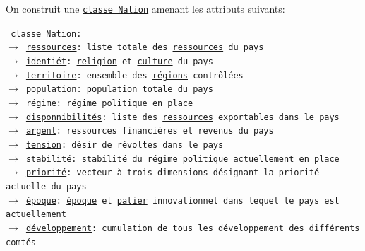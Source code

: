 \documentclass{article}
\newcommand{\ulcolor}[2][class]{\setulcolor{#1}\ul{#2}}
\newcommand{\ulcolor}[2][var]{\setulcolor{#1}\ul{#2}}
\newcommand{\ulcolor}[2][func]{\setulcolor{#1}\ul{#2}}
\newcommand*{\mybox}[2]{\colorbox{#1!30}{\parbox{.98\linewidth}{#2}}}
\newcommand\tab[1][0.5cm]{\hspace*{#1}}
\newcommand{\genbox}[1]{\mybox{verylightgray}{#1}}
\newcommand{\classbox}[1]{\mybox{palegreen}{\texttt{\textcolor{codeColour}{#1}}}}
\newcommand{\class}[1]{\texttt{\textcolor{codeColour}{\ulcolor[class]{#1}}}}
\newcommand{\var}[1]{\texttt{\textcolor{codeColour}{\ulcolor[var]{#1}}}}
\begin{document}
            \tab \genbox{
                On construit une \class{classe Nation} amenant les attributs suivants: \\
                \tab \classbox{
                    classe Nation: \\
                        $\rightarrow$ \var{ressources}: liste totale des \class{ressources} du pays \\
                        $\rightarrow$ \var{identi\'et}: \class{religion} et \class{culture} du pays \\
                        $\rightarrow$ \var{territoire}: ensemble des \class{r\'egions} contrôlées \\
                        $\rightarrow$ \var{population}: population totale du pays \\
                        $\rightarrow$ \var{r\'egime}: \class{r\'egime politique} en place \\
                        $\rightarrow$ \var{disponnibilit\'es}: liste des \class{ressources} exportables dans le pays \\
                        $\rightarrow$ \var{argent}: ressources financières et revenus du pays \\
                        $\rightarrow$ \var{tension}: désir de révoltes dans le pays \\
                        $\rightarrow$ \var{stabilit\'e}: stabilité du \class{r\'egime politique} actuellement en place \\
                        $\rightarrow$ \var{priorit\'e}: vecteur à trois dimensions désignant la priorité actuelle du  pays \\
                        $\rightarrow$ \var{\'epoque}: \class{\'epoque} et \var{palier} innovationnel dans lequel le pays est actuellement \\
                        $\rightarrow$ \var{d\'eveloppement}: cumulation de tous les développement des différents comtés \\
                }}

            
\end{document}
